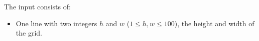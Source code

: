 
  The input consists of:
  \begin{itemize}
    \item One line with two integers $h$ and $w$ ($1 \le h,w \le 100$), the height and width of the grid.
  \end{itemize}


\vspace{-4mm}
